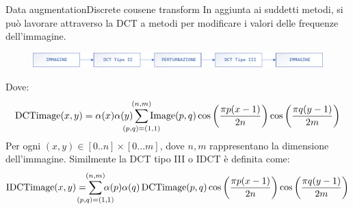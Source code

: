 \documentclass[aspectratio=169]{beamer}
\begin{document}
\begin{frame}{Data augmentation}{Discrete cousene transform}
    In aggiunta ai suddetti metodi, si può lavorare attraverso la DCT a metodi per modificare i valori delle frequenze dell'immagine.

    \begin{figure}[ht]
        \centering
        \includegraphics[width=1\textwidth]{data-augmentation/dct-trasformazione.pdf}
    \end{figure}
    Dove:
    \[\operatorname{DCTimage} ( x , y ) = \alpha( x ) \alpha (y) \sum _ { \mathclap{(p , q) = (1,1)} } ^ { \mathclap{(n,m)} }  \operatorname { Image } ( p , q ) \cos \left(\frac { \pi p  (x-1) } { 2 n }  \right) \cos \left(\frac { \pi q  (y-1) } { 2 m }  \right) \]
    Per ogni \((x,y) \in [0..n]\times [0...m]\), dove \(n,m\) rappresentano la dimensione dell'immagine. Similmente la DCT tipo III o IDCT è definita come:
    \[\operatorname{IDCTimage} ( x , y ) = \sum _ { \mathclap{(p , q) = (1,1) }} ^ {  \mathclap{(n,m) }} \alpha( p ) \alpha (q) \operatorname { DCTimage } ( p , q ) \cos \left(\frac {  \pi p  (x-1) } { 2 n }  \right) \cos \left(\frac { \pi q  (y-1) } { 2 m }  \right) \]
\end{frame}
\end{document}

